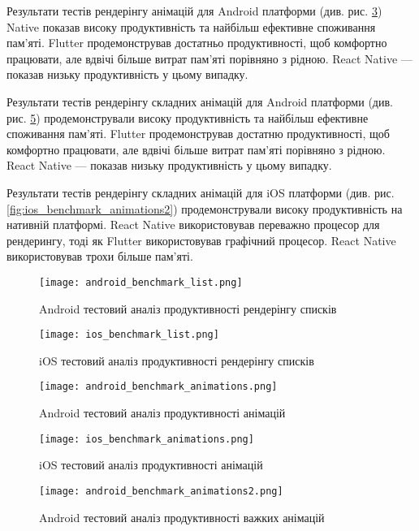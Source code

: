 Результати тестів рендерінгу анімацій для Android платформи (див. рис. \ref{fig:android_benchmark_animations})
Native показав високу продуктивність та найбільш ефективне споживання пам'яті.
Flutter продемонстрував достатньо продуктивності, щоб комфортно працювати, але вдвічі більше витрат пам'яті порівняно з рідною.
React Native — показав низьку продуктивність у цьому випадку.

Результати тестів рендерінгу складних анімацій для Android платформи (див. рис. \ref{fig:android_benchmark_animations2})
продемонстрували високу продуктивність та найбільш ефективне споживання пам'яті.
Flutter продемонстрував достатню продуктивності, щоб комфортно працювати, але вдвічі більше витрат пам'яті порівняно з рідною.
React Native — показав низьку продуктивність у цьому випадку.

Результати тестів рендерінгу складних анімацій для iOS платформи (див. рис. \ref{fig:ios_benchmark_animations2})
продемонстрували високу продуктивність на нативній платформі.
React Native використовував переважно процесор для рендерингу, тоді як Flutter використовував графічний процесор.
React Native використовував трохи більше пам'яті.

\begin{figure}
    \texttt{[image: android\_benchmark\_list.png]}
    \caption{Android тестовий аналіз продуктивності рендерінгу списків}
    \label{fig:android_benchmark_list}
\end{figure}

\begin{figure}
    \texttt{[image: ios\_benchmark\_list.png]}
    \caption{iOS тестовий аналіз продуктивності рендерінгу списків}
    \label{fig:ios_benchmark_list}
\end{figure}

\begin{figure}
    \texttt{[image: android\_benchmark\_animations.png]}
    \caption{Android тестовий аналіз продуктивності анімацій}
    \label{fig:android_benchmark_animations}
\end{figure}

\begin{figure}
    \texttt{[image: ios\_benchmark\_animations.png]}
    \caption{iOS тестовий аналіз продуктивності анімацій}
    \label{fig:ios_benchmark_animations}
\end{figure}

\begin{figure}
    \texttt{[image: android\_benchmark\_animations2.png]}
    \caption{Android тестовий аналіз продуктивності важких анімацій}
    \label{fig:android_benchmark_animations2}
\end{figure}

